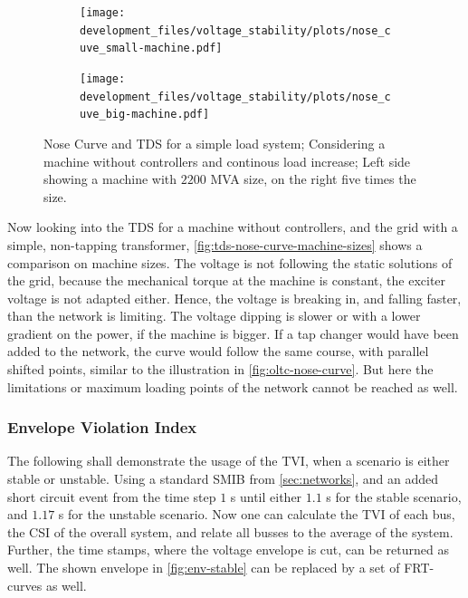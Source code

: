 \begin{figure}[htbp!]
    \centering
    \begin{subfigure}[b]{.49\linewidth}
        \centering
        \texttt{[image: development\_files/voltage\_stability/plots/nose\_cuve\_small-machine.pdf]}
    \end{subfigure}
    \begin{subfigure}[b]{.49\linewidth}
        \centering
        \texttt{[image: development\_files/voltage\_stability/plots/nose\_cuve\_big-machine.pdf]}
    \end{subfigure}
    \caption[Nose Curve and \acs{TDS} for a simple load system without machine controllers]{Nose Curve and \acs{TDS} for a simple load system; Considering a machine without controllers and continous load increase; Left side showing a machine with $2200$ MVA size, on the right five times the size.}
    \label{fig:tds-nose-curve-machine-sizes}
\end{figure}

Now looking into the \acs{TDS} for a machine without controllers, and the grid with a simple, non-tapping transformer, \autoref{fig:tds-nose-curve-machine-sizes} shows a comparison on machine sizes.
The voltage is not following the static solutions of the grid, because the mechanical torque at the machine is constant, the exciter voltage is not adapted either.
Hence, the voltage is breaking in, and falling faster, than the network is limiting.
The voltage dipping is slower or with a lower gradient on the power, if the machine is bigger.
If a tap changer would have been added to the network, the curve would follow the same course, with parallel shifted points, similar to the illustration in \autoref{fig:oltc-nose-curve}.
But here the limitations or maximum loading points of the network cannot be reached as well.

\subsubsection{Envelope Violation Index}

The following shall demonstrate the usage of the \acf{TVI}, when a scenario is either stable or unstable.
Using a standard \acs{SMIB} from \autoref{sec:networks}, and an added short circuit event from the time step $1$ s until either $1.1$ s for the stable scenario, and $1.17$ s for the unstable scenario.
Now one can calculate the \acs{TVI} of each bus, the \acs{CSI} of the overall system, and relate all busses to the average of the system.
Further, the time stamps, where the voltage envelope is cut, can be returned as well. 
The shown envelope in \autoref{fig:env-stable} can be replaced by a set of \acs{FRT}-curves as well.

